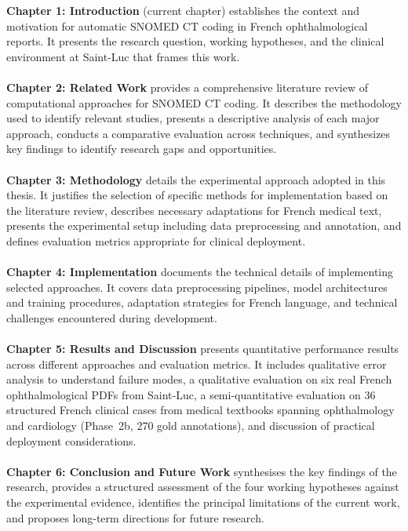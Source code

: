 \textbf{Chapter 1: Introduction} (current chapter) establishes the context and motivation for automatic SNOMED CT coding in French ophthalmological reports. It presents the research question, working hypotheses, and the clinical environment at Saint-Luc that frames this work.\\
\\
\textbf{Chapter 2: Related Work} provides a comprehensive literature review of computational approaches for SNOMED CT coding. It describes the methodology used to identify relevant studies, presents a descriptive analysis of each major approach, conducts a comparative evaluation across techniques, and synthesizes key findings to identify research gaps and opportunities.\\
\\
\textbf{Chapter 3: Methodology} details the experimental approach adopted in this thesis. It justifies the selection of specific methods for implementation based on the literature review, describes necessary adaptations for French medical text, presents the experimental setup including data preprocessing and annotation, and defines evaluation metrics appropriate for clinical deployment.\\
\\
\textbf{Chapter 4: Implementation} documents the technical details of implementing selected approaches. It covers data preprocessing pipelines, model architectures and training procedures, adaptation strategies for French language, and technical challenges encountered during development.\\
\\
\textbf{Chapter 5: Results and Discussion} presents quantitative performance results across different approaches and evaluation metrics. It includes qualitative error analysis to understand failure modes, a qualitative evaluation on six real French ophthalmological PDFs from Saint-Luc, a semi-quantitative evaluation on 36 structured French clinical cases from medical textbooks spanning ophthalmology and cardiology (Phase~2b, 270 gold annotations), and discussion of practical deployment considerations.\\
\\
\textbf{Chapter 6: Conclusion and Future Work} synthesises the key findings of the research, provides a structured assessment of the four working hypotheses against the experimental evidence, identifies the principal limitations of the current work, and proposes long-term directions for future research.